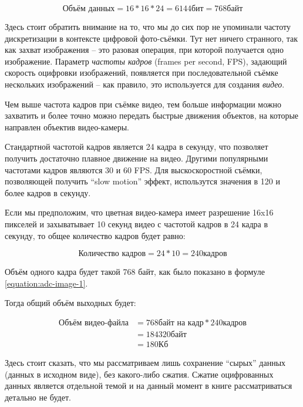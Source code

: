 \documentclass[../sparc.tex]{subfiles}
\begin{document}
\begin{equation}
  \mbox{Объём данных} = 16 * 16 * 24 = 6144 \mbox{бит} = 768 \mbox{байт}
  \label{equation:adc-image-1}
\end{equation}

Здесь стоит обратить внимание на то, что мы до сих пор не упоминали частоту
дискретизации в контексте цифровой фото-съёмки.  Тут нет ничего странного, так
как захват изображения -- это разовая операция, при которой получается одно
изображение.  Параметр \emph{частоты кадров} (frames per second, FPS), задающий
скорость оцифровки изображений, появляется при последовательной съёмке
нескольких изображений -- как правило, это используется для создания
\emph{видео}.

Чем выше частота кадров при съёмке видео, тем больше информации можно захватить
и более точно можно передать быстрые движения объектов, на которые направлен
объектив видео-камеры.

Стандартной частотой кадров является 24 кадра в секунду, что позволяет получить
достаточно плавное движение на видео.  Другими популярными частотами кадров
являются 30 и 60 \gls{FPS}.  Для выскоскоростной съёмки, позволяющей получить
``slow motion'' эффект, использутся значения в 120 и более кадров в секунду.

Если мы предположим, что цветная видео-камера имеет разрешение 16x16 пикселей и
захыватывает 10 секунд видео с частотой кадров в 24 кадра в секунду, то общее
количество кадров будет равно:

\begin{equation}
  \mbox{Количество кадров}  = 24 * 10 = 240 \mbox{кадров}
\end{equation}

Объём одного кадра будет такой 768 байт, как было показано в формуле
\ref{equation:adc-image-1}.

Тогда общий объём выходных будет:

\begin{align}
  \mbox{Объём видео-файла} & = 768 \mbox{байт на кадр} * 240 \mbox{кадров} \\
  & = 184320 \mbox{байт} \\
  & = 180 \mbox{Кб}
  \label{equation:adc-image-2}
\end{align}

Здесь стоит сказать, что мы рассматриваем лишь сохранение ``сырых'' данных
(данных в исходном виде), без какого-либо сжатия.  Сжатие оцифрованных данных
является отдельной темой и на данный момент в книге рассматриваться детально не
будет.
\end{document}
